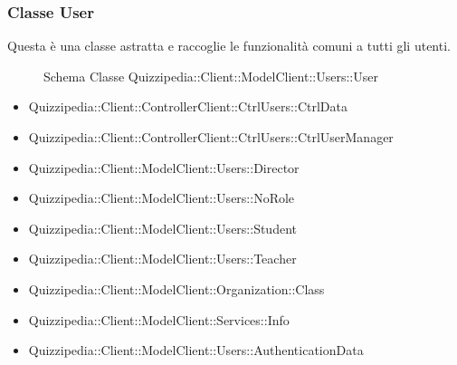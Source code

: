 \subsubsection{Classe User}
Questa è una classe astratta e raccoglie le funzionalità comuni a tutti gli utenti.
\begin{figure}[H]
\centering
\noindent{}
\caption[Schema Classe User]{Schema Classe Quizzipedia::Client::ModelClient::Users::User}
\end{figure}
\begin{itemize}
\item Quizzipedia::Client::ControllerClient::CtrlUsers::CtrlData
\item Quizzipedia::Client::ControllerClient::CtrlUsers::CtrlUserManager
\item Quizzipedia::Client::ModelClient::Users::Director
\item Quizzipedia::Client::ModelClient::Users::NoRole
\item Quizzipedia::Client::ModelClient::Users::Student
\item Quizzipedia::Client::ModelClient::Users::Teacher
\end{itemize}
\begin{itemize}
\item Quizzipedia::Client::ModelClient::Organization::Class
\item Quizzipedia::Client::ModelClient::Services::Info
\item Quizzipedia::Client::ModelClient::Users::AuthenticationData
\end{itemize}
